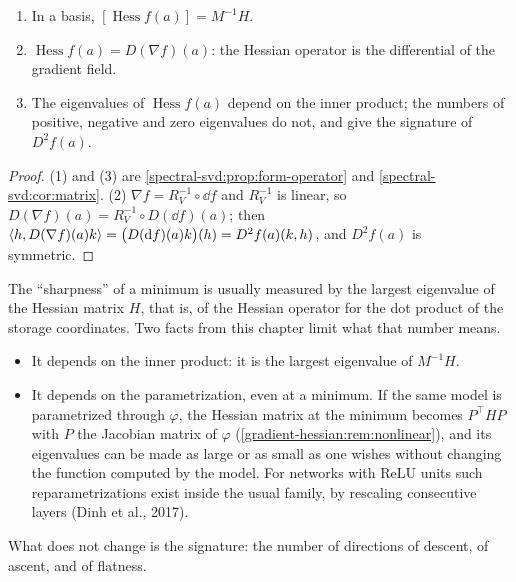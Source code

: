\begin{notechapter}
\begin{proposition}\label{gradient-hessian:prop:hessian}
\begin{enumerate}[nosep]
  \item In a basis, $[\operatorname{Hess}f(a)] = M^{-1}H$.
  \item $\operatorname{Hess}f(a) = D(\nabla f)(a)$: the Hessian operator
        is the differential of the gradient field.
  \item The eigenvalues of $\operatorname{Hess}f(a)$ depend on the inner
        product; the numbers of positive, negative and zero eigenvalues
        do not, and give the signature of $D^2f(a)$.
\end{enumerate}
\end{proposition}

\begin{proof}
(1) and (3) are \cref{spectral-svd:prop:form-operator} and
\cref{spectral-svd:cor:matrix}. (2) $\nabla f = R_V^{-1}\circ\dd f$ and
$R_V^{-1}$ is linear, so $D(\nabla f)(a) = R_V^{-1}\circ D(\dd f)(a)$;
then $\left\langle h, D(\nabla f)(a)k \right\rangle = \bigl(D(\mathrm{d} f)(a)k\bigr)(h)
= D^2f(a)(k, h)$, and $D^2f(a)$ is symmetric.
\end{proof}

\begin{mlthread}
The ``sharpness'' of a minimum is usually measured by the largest
eigenvalue of the Hessian matrix $H$, that is, of the Hessian operator for
the dot product of the storage coordinates. Two facts from this chapter
limit what that number means.
\begin{itemize}[nosep]
  \item It depends on the inner product: it is the largest eigenvalue of
        $M^{-1}H$.
  \item It depends on the parametrization, even at a minimum. If the same
        model is parametrized through $\varphi$, the Hessian matrix at the
        minimum becomes $P^\top HP$ with $P$ the Jacobian matrix of
        $\varphi$ (\cref{gradient-hessian:rem:nonlinear}), and its
        eigenvalues can be made as large or as small as one wishes
        without changing the function computed by the model. For networks
        with ReLU units such reparametrizations exist inside the usual
        family, by rescaling consecutive layers (Dinh et al., 2017).
\end{itemize}
What does not change is the signature: the number of directions of
descent, of ascent, and of flatness.
\end{mlthread}


\end{notechapter}
